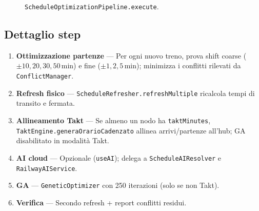 \begin{figure}[htbp]
\centering
{}
\caption{\texttt{ScheduleOptimizationPipeline.execute}.}
\end{figure}

\subsection{Dettaglio step}

\begin{enumerate}
  \item \textbf{Ottimizzazione partenze} --- Per ogni nuovo treno, prova
    shift coarse ($\pm 10, 20, 30, 50$\,min) e fine ($\pm 1, 2, 5$\,min);
    minimizza i conflitti rilevati da \texttt{ConflictManager}.
  \item \textbf{Refresh fisico} --- \texttt{ScheduleRefresher.refreshMultiple}
    ricalcola tempi di transito e fermata.
  \item \textbf{Allineamento Takt} --- Se almeno un nodo ha
    \texttt{taktMinutes}, \texttt{TaktEngine.generaOrarioCadenzato}
    allinea arrivi/partenze all'hub; GA disabilitato in modalità Takt.
  \item \textbf{AI cloud} --- Opzionale (\texttt{useAI}); delega a
    \texttt{ScheduleAIResolver} e \texttt{RailwayAIService}.
  \item \textbf{GA} --- \texttt{GeneticOptimizer} con 250 iterazioni
    (solo se non Takt).
  \item \textbf{Verifica} --- Secondo refresh + report conflitti residui.
\end{enumerate}

